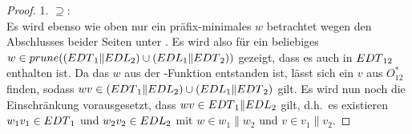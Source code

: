 \begin{proof}
  1. \glqq{}$\supseteq$\grqq{}:\\
  Es wird ebenso wie oben nur ein präfix-minimales $w$ betrachtet wegen den
  Abschlusses beider Seiten unter \cont{}. Es wird also für ein beliebiges
  $w\in prune{}((EDT{}_1\|EDL{}_2)\cup (EDL{}_1\|EDT{}_2))$ gezeigt, dass
  es auch in $EDT{}_{12}$ enthalten ist. Da das $w$ aus der \prune{}-Funktion
  entstanden ist, lässt sich ein $v$ aus $O_{12}^*$ finden, sodass $wv\in
  (EDT{}_1\|EDL{}_2)\cup (EDL{}_1\|EDT{}_2)$ gilt. Es wird nun noch die
  Einschränkung vorausgesetzt, dass \oBdA{} $wv\in EDT{}_1\|EDL{}_2$ gilt,
  d.h.\ es existieren $w_1v_1\in EDT{}_1$ und $w_2v_2\in EDL{}_2$ mit $w\in
  w_1\|w_2$ und $v\in v_1\|v_2$.

\end{proof}
